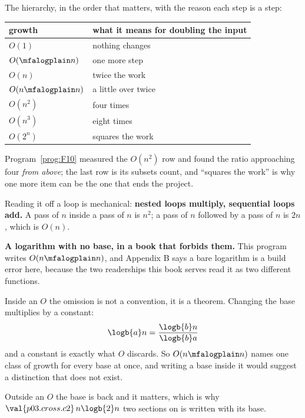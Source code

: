 \begin{fr}
The hierarchy, in the order that matters, with the reason each step is a step:

\begin{center}
\begin{tabular}{ll}
\toprule
growth & what it means for doubling the input \\
\midrule
$O(1)$ & nothing changes \\
$O(\mfalogplain n)$ & one more step \\
$O(n)$ & twice the work \\
$O(n \mfalogplain n)$ & a little over twice \\
$O(n^{2})$ & four times \\
$O(n^{3})$ & eight times \\
$O(2^{n})$ & squares the work \\
\bottomrule
\end{tabular}
\end{center}

Program~\ref{prog:F10} measured the $O(n^{2})$ row and found the ratio
approaching four \emph{from above}; the last row is its subsets count, and
\enquote{squares the work} is why one more item can be the one that ends the
project.

Reading it off a loop is mechanical: \textbf{nested loops multiply, sequential
loops add.} A pass of $n$ inside a pass of $n$ is $n^{2}$; a pass of $n$
followed by a pass of $n$ is $2n$, which is $O(n)$.

\begin{notationbox}
\textbf{A logarithm with no base, in a book that forbids them.} This program
writes $O(n \mfalogplain n)$, and Appendix B says a bare logarithm is a build
error here, because the two readerships this book serves read it as two
different functions.

Inside an $O$ the omission is not a convention, it is a theorem. Changing the
base multiplies by a constant:
\[ \logb{a} n = \frac{\logb{b} n}{\logb{b} a} \]
and a constant is exactly what $O$ discards. So $O(n \mfalogplain n)$ names one
class of growth for every base at once, and writing a base inside it would
suggest a distinction that does not exist.

Outside an $O$ the base is back and it matters, which is why
$\val{p03.cross.c2}\,n\logb{2}n$ two sections on is written with its base.
\end{notationbox}
\end{fr}

